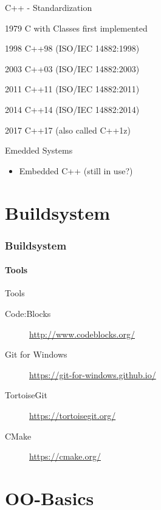\documentclass{beamer}
\begin{document}
\begin{frame}{C++ - Standardization}
\itemize{}
\item[1979] C with Classes first implemented 
\item[1998] C++98 (ISO/IEC 14882:1998) 
\item[2003] C++03 (ISO/IEC 14882:2003)
\item[2011] C++11 (ISO/IEC 14882:2011)
\item[2014] C++14 (ISO/IEC 14882:2014)
\item[2017] C++17 (also called C++1z)
\end{frame}

\begin{frame}{Emedded Systems}
\begin{itemize}
  \item Embedded C++ (still in use?)
\end{itemize}
\end{frame}

\part{Buildsystem}

\section{Buildsystem}
\subsection{Tools}
\begin{frame}{Tools}
\begin{description}
  \item[Code:Blocks] \url{http://www.codeblocks.org/}
  \item[Git for Windows] \url{https://git-for-windows.github.io/}
  \item[TortoiseGit] \url{https://tortoisegit.org/}
  \item[CMake] \url{https://cmake.org/}  
\end{description}

\end{frame}

\part{OO-Basics}
\end{document}
